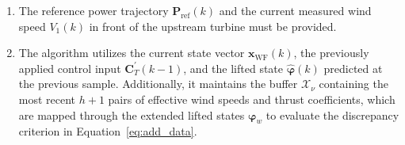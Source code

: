 \begin{enumerate}
    \item The reference power trajectory $\bm{P}_{\text{ref}}(k)$ and the current measured wind speed $V_{1}(k)$ in front of the upstream turbine must be provided.
    \item The algorithm utilizes the current state vector $\bm{x}_{\text{WF}}(k)$, the previously applied control input $\bm{C}_T^\prime(k-1)$, and the lifted state $\hat{\bm{\varphi}}(k)$ predicted at the previous sample. Additionally, it maintains the buffer $\mathcal{X}_{\nu}$ containing the most recent $h+1$ pairs of effective wind speeds and thrust coefficients, which are mapped through the extended lifted states $\bm{\varphi}_w$ to evaluate the discrepancy criterion in Equation~\eqref{eq:add_data}.
\end{enumerate}

%


%

